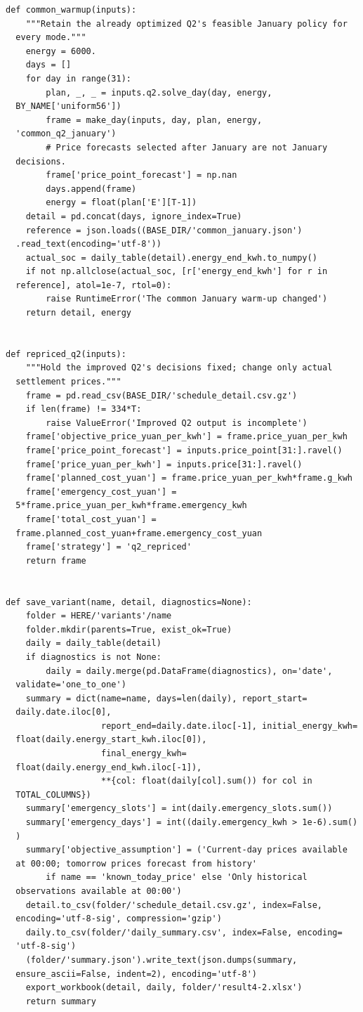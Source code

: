 \begin{verbatim}
def common_warmup(inputs):
    """Retain the already optimized Q2's feasible January policy for
  every mode."""
    energy = 6000.
    days = []
    for day in range(31):
        plan, _, _ = inputs.q2.solve_day(day, energy,
  BY_NAME['uniform56'])
        frame = make_day(inputs, day, plan, energy,
  'common_q2_january')
        # Price forecasts selected after January are not January
  decisions.
        frame['price_point_forecast'] = np.nan
        days.append(frame)
        energy = float(plan['E'][T-1])
    detail = pd.concat(days, ignore_index=True)
    reference = json.loads((BASE_DIR/'common_january.json')
  .read_text(encoding='utf-8'))
    actual_soc = daily_table(detail).energy_end_kwh.to_numpy()
    if not np.allclose(actual_soc, [r['energy_end_kwh'] for r in
  reference], atol=1e-7, rtol=0):
        raise RuntimeError('The common January warm-up changed')
    return detail, energy


def repriced_q2(inputs):
    """Hold the improved Q2's decisions fixed; change only actual
  settlement prices."""
    frame = pd.read_csv(BASE_DIR/'schedule_detail.csv.gz')
    if len(frame) != 334*T:
        raise ValueError('Improved Q2 output is incomplete')
    frame['objective_price_yuan_per_kwh'] = frame.price_yuan_per_kwh
    frame['price_point_forecast'] = inputs.price_point[31:].ravel()
    frame['price_yuan_per_kwh'] = inputs.price[31:].ravel()
    frame['planned_cost_yuan'] = frame.price_yuan_per_kwh*frame.g_kwh
    frame['emergency_cost_yuan'] =
  5*frame.price_yuan_per_kwh*frame.emergency_kwh
    frame['total_cost_yuan'] =
  frame.planned_cost_yuan+frame.emergency_cost_yuan
    frame['strategy'] = 'q2_repriced'
    return frame


def save_variant(name, detail, diagnostics=None):
    folder = HERE/'variants'/name
    folder.mkdir(parents=True, exist_ok=True)
    daily = daily_table(detail)
    if diagnostics is not None:
        daily = daily.merge(pd.DataFrame(diagnostics), on='date',
  validate='one_to_one')
    summary = dict(name=name, days=len(daily), report_start=
  daily.date.iloc[0],
                   report_end=daily.date.iloc[-1], initial_energy_kwh=
  float(daily.energy_start_kwh.iloc[0]),
                   final_energy_kwh=
  float(daily.energy_end_kwh.iloc[-1]),
                   **{col: float(daily[col].sum()) for col in
  TOTAL_COLUMNS})
    summary['emergency_slots'] = int(daily.emergency_slots.sum())
    summary['emergency_days'] = int((daily.emergency_kwh > 1e-6).sum()
  )
    summary['objective_assumption'] = ('Current-day prices available
  at 00:00; tomorrow prices forecast from history'
        if name == 'known_today_price' else 'Only historical
  observations available at 00:00')
    detail.to_csv(folder/'schedule_detail.csv.gz', index=False,
  encoding='utf-8-sig', compression='gzip')
    daily.to_csv(folder/'daily_summary.csv', index=False, encoding=
  'utf-8-sig')
    (folder/'summary.json').write_text(json.dumps(summary,
  ensure_ascii=False, indent=2), encoding='utf-8')
    export_workbook(detail, daily, folder/'result4-2.xlsx')
    return summary



\end{verbatim}
